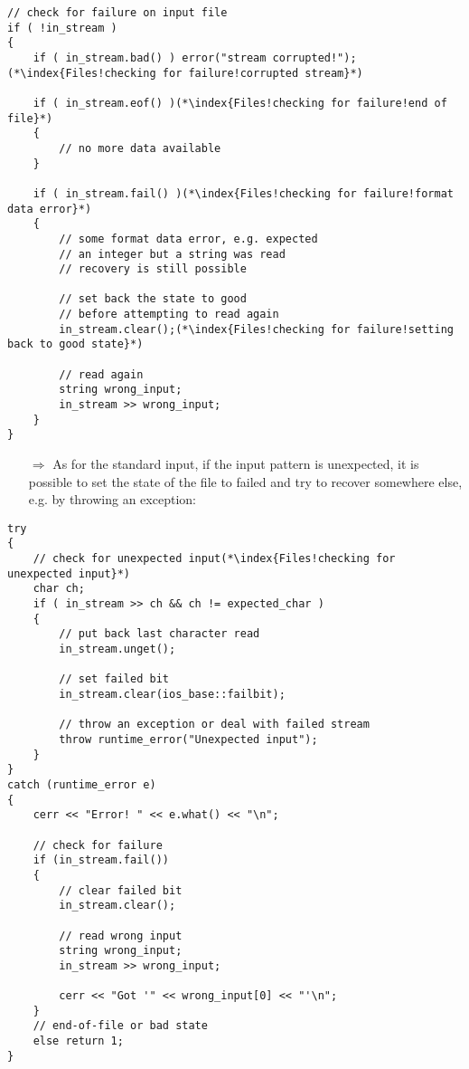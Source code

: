 \documentclass[10pt]{article}
\begin{document}
\begin{lstlisting}
// check for failure on input file
if ( !in_stream )
{
    if ( in_stream.bad() ) error("stream corrupted!");(*\index{Files!checking for failure!corrupted stream}*)
    
    if ( in_stream.eof() )(*\index{Files!checking for failure!end of file}*)
    { 
        // no more data available
    }
    
    if ( in_stream.fail() )(*\index{Files!checking for failure!format data error}*)
    {
        // some format data error, e.g. expected
        // an integer but a string was read
        // recovery is still possible
        
        // set back the state to good 
        // before attempting to read again
        in_stream.clear();(*\index{Files!checking for failure!setting back to good state}*)
        
        // read again
        string wrong_input;
        in_stream >> wrong_input;
    }
}
\end{lstlisting}
\begin{enumerate}
\item[$\Rightarrow$] As for the standard input, if the input pattern is unexpected, it is possible to set the state of the file to failed
and try to recover somewhere else, e.g. by throwing an exception:
\end{enumerate}
\begin{lstlisting}
try
{
    // check for unexpected input(*\index{Files!checking for unexpected input}*)
    char ch;
    if ( in_stream >> ch && ch != expected_char )
    {
        // put back last character read
        in_stream.unget();
        
        // set failed bit
        in_stream.clear(ios_base::failbit);
    
        // throw an exception or deal with failed stream
        throw runtime_error("Unexpected input");
    }
}
catch (runtime_error e)
{
    cerr << "Error! " << e.what() << "\n";
            
    // check for failure
    if (in_stream.fail())
    {
        // clear failed bit
        in_stream.clear();
                
        // read wrong input
        string wrong_input;
        in_stream >> wrong_input;
                    
        cerr << "Got '" << wrong_input[0] << "'\n";
    }
    // end-of-file or bad state
    else return 1;
}
\end{lstlisting}
\end{document}
